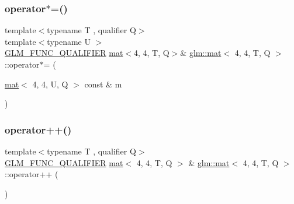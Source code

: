 \subsubsection{\texorpdfstring{operator$\ast$=()}{operator*=()}\hspace{0.1cm}{\footnotesize\ttfamily [4/4]}}
{\footnotesize\ttfamily template$<$typename T , qualifier Q$>$ \\
template$<$typename U $>$ \\
\hyperlink{setup_8hpp_a33fdea6f91c5f834105f7415e2a64407}{G\+L\+M\+\_\+\+F\+U\+N\+C\+\_\+\+Q\+U\+A\+L\+I\+F\+I\+ER} \hyperlink{structglm_1_1mat}{mat}$<$4, 4, T, Q$>$\& \hyperlink{structglm_1_1mat}{glm\+::mat}$<$ 4, 4, T, Q $>$\+::operator$\ast$= (\begin{DoxyParamCaption}\item[{\hyperlink{structglm_1_1mat}{mat}$<$ 4, 4, U, Q $>$ const \&}]{m }\end{DoxyParamCaption})}

\mbox{\label{structglm_1_1mat_3_014_00_014_00_01_t_00_01_q_01_4_a39435dc193ef8ac3a8c417651ae6440e}} 
\subsubsection{\texorpdfstring{operator++()}{operator++()}\hspace{0.1cm}{\footnotesize\ttfamily [1/2]}}
{\footnotesize\ttfamily template$<$typename T , qualifier Q$>$ \\
\hyperlink{setup_8hpp_a33fdea6f91c5f834105f7415e2a64407}{G\+L\+M\+\_\+\+F\+U\+N\+C\+\_\+\+Q\+U\+A\+L\+I\+F\+I\+ER} \hyperlink{structglm_1_1mat}{mat}$<$ 4, 4, T, Q $>$ \& \hyperlink{structglm_1_1mat}{glm\+::mat}$<$ 4, 4, T, Q $>$\+::operator++ (\begin{DoxyParamCaption}{ }\end{DoxyParamCaption})}

\mbox{\label{structglm_1_1mat_3_014_00_014_00_01_t_00_01_q_01_4_a63e4b9e5fd2328e10fe75fec5ab1a10b}} 
